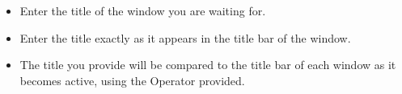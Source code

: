 \begin{itemize}
\item Enter the title of the window you are waiting for. 
\item Enter the title exactly as it appears in the title bar of the window.
\item The title you provide will be compared to the title bar of each window as it becomes active, using the Operator provided.
\end{itemize}

